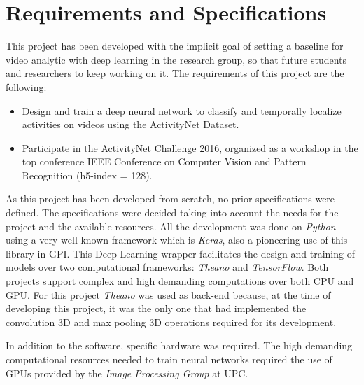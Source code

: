\section{Requirements and Specifications}

This project has been developed with the implicit goal of setting a baseline for video analytic with deep learning in the research group, so that future students and researchers to keep working on it. The requirements of this project are the following:
\begin{itemize}
    \item Design and train a deep neural network to classify and temporally localize activities on videos using the ActivityNet Dataset.
    \item Participate in the ActivityNet Challenge 2016, organized as a workshop in the top conference IEEE Conference on Computer Vision and Pattern Recognition (h5-index = 128).
\end{itemize}


As this project has been developed from scratch, no prior specifications were defined. The specifications were decided taking into account the needs for the project and the available resources. All the development was done on \textit{Python} using a very well-known framework which is \textit{Keras}, also a pioneering use of this library in GPI. This Deep Learning wrapper facilitates the design and training of models over two computational frameworks: \textit{Theano}\cite{theano2016theano} and \textit{TensorFlow}\cite{abadi2016tensorflow}. Both  projects support complex and high demanding computations over both CPU and GPU. For this project \textit{Theano} was used as back-end because, at the time of developing this project, it was the only one that had implemented the convolution 3D and max pooling 3D operations required for its development.

In addition to the software, specific hardware was required. The high demanding computational resources needed to train neural networks required the use of GPUs provided by the \textit{Image Processing Group} at UPC.



